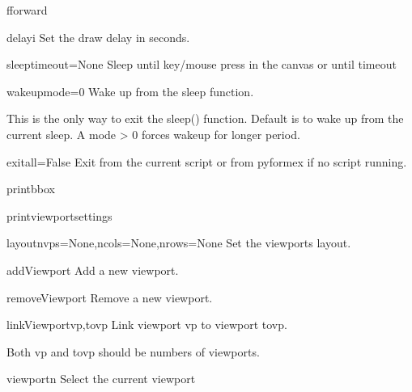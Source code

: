 \begin{funcdesc}{fforward}{}
\end{funcdesc}

\begin{funcdesc}{delay}{i}
Set the draw delay in seconds.
\end{funcdesc}

\begin{funcdesc}{sleep}{timeout=None}
Sleep until key/mouse press in the canvas or until timeout
\end{funcdesc}

\begin{funcdesc}{wakeup}{mode=0}
Wake up from the sleep function.

This is the only way to exit the sleep() function.
Default is to wake up from the current sleep. A mode > 0
forces wakeup for longer period.

\end{funcdesc}

\begin{funcdesc}{exit}{all=False}
Exit from the current script or from pyformex if no script running.
\end{funcdesc}

\begin{funcdesc}{printbbox}{}
\end{funcdesc}

\begin{funcdesc}{printviewportsettings}{}
\end{funcdesc}

\begin{funcdesc}{layout}{nvps=None,ncols=None,nrows=None}
Set the viewports layout.
\end{funcdesc}

\begin{funcdesc}{addViewport}{}
Add a new viewport.
\end{funcdesc}

\begin{funcdesc}{removeViewport}{}
Remove a new viewport.
\end{funcdesc}

\begin{funcdesc}{linkViewport}{vp,tovp}
Link viewport vp to viewport tovp.

Both vp and tovp should be numbers of viewports. 

\end{funcdesc}

\begin{funcdesc}{viewport}{n}
Select the current viewport
\end{funcdesc}

